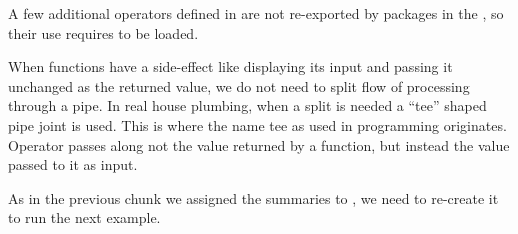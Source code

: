 \documentclass[krantz2]{krantz}\usepackage{knitr}%
\begin{document}
A few additional operators defined in  are not re-exported by packages in the , so their use requires  to be loaded.

When functions have a side-effect like  displaying its input and passing it unchanged as the returned value, we do not need to split flow of processing through a pipe. In real house plumbing, when a split is needed a ``tee'' shaped pipe joint is used. This is where the name tee as used in programming originates. Operator  passes along not the value returned by a function, but instead the value passed to it as input.

As in the previous chunk we assigned the summaries to , we need to re-create it to run the next example.

\begin{knitrout}\footnotesize
{}\color{fgcolor}\begin{kframe}
\begin{alltt}
 \hlkwb{<-} \hlstd{(} \hlstd{=} \hlopt{:}\hlstd{,}  \hlstd{=} \hlstd{(letters[}\hlopt{:}\hlstd{],} \hlstd{))}
\end{alltt}
\end{kframe}
\end{knitrout}

\begin{knitrout}\footnotesize
{}\color{fgcolor}
\end{knitrout}
\end{document}
